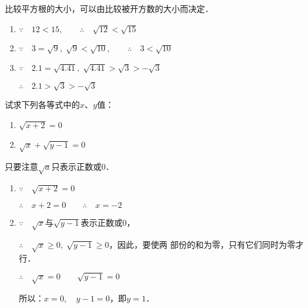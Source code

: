 \begin{solution}
    比较平方根的大小，可以由比较被开方数的大小而决定．
\begin{enumerate}
    \item $\because\quad 12<15,\qquad \therefore\quad \sqrt{12}<\sqrt{15}$
    \item  $\because\quad 3=\sqrt{9},\; \sqrt{9}<\sqrt{10},\qquad \therefore\quad 3<\sqrt{10}$
    \item  $\because\quad 2.1=\sqrt{4.41},\;\sqrt{4.41}>\sqrt{3}>-\sqrt{3}$
    
    $\therefore\quad 2.1>\sqrt{3}>-\sqrt{3}$
\end{enumerate}

\end{solution}




\begin{example}
    试求下列各等式中的$x$、$y$值：
    \begin{enumerate}
        \item $\sqrt{x+2}=0$
        \item $\sqrt{x}+\sqrt{y-1}=0$
    \end{enumerate}
\end{example}


\begin{solution}
只要注意$\sqrt{a}$只表示正数或0．
\begin{enumerate}
    \item $\because\quad \sqrt{x+2}=0$
    
    $\therefore\quad x+2=0\qquad \therefore\quad x=-2$  
    \item $\because\quad \sqrt{x}$与$\sqrt{y-1}$表示正数或0，
    
    $\therefore\quad \sqrt{x}\ge 0, \; \sqrt{y-1}\ge 0$，因此，要使两
    部份的和为零，只有它们同时为零才行．

    $\therefore\quad\sqrt{x}=0\qquad \sqrt{y-1}=0$

    所以：$x=0,\quad y-1=0$，即$y=1$．
\end{enumerate}
\end{solution}

